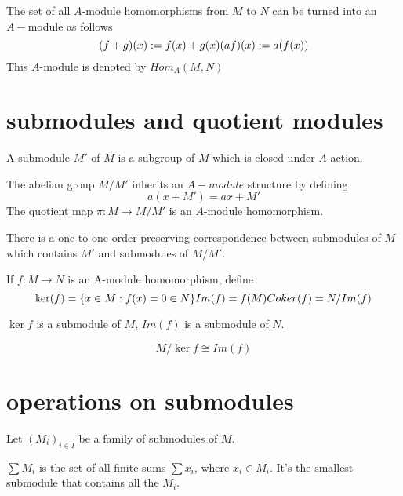 \documentclass[11pt,fleqn]{book} %
\begin{document}
\begin{CJK}{UTF8}{gkai}
\begin{definition}
	The set of all $A$-module homomorphisms from $M$ to $N$ can be turned into an $A-$module as follows \[
		(f+g)(x) := f(x) + g(x) \\
		(af)(x) := a(f(x))\]
	This $A$-module is denoted by $Hom_A(M, N)$
\end{definition}

\section{submodules and quotient modules}
\begin{definition}
	A submodule $M'$ of $M$ is a subgroup of $M$ which is closed under $A$-action.
\end{definition}

\begin{definition}
	[quotient] The abelian group $M/M'$ inherits an $A-module$ structure by defining 
	\[
		a(x + M') = ax + M'\]
	The quotient map $\pi: M \to M/M'$ is an $A$-module homomorphism.
\end{definition}

\begin{proposition}
	 There is a one-to-one order-preserving correspondence between submodules of $M$ which contains $M'$ and submodules of $M/M'$.
\end{proposition}

\begin{definition}
	 If $f:M\to N$ is an A-module homomorphism, define 
	\[
		\ker(f) = \{x\in M: f(x) = 0\in N\}\\
		Im(f) = f(M)\\
		Coker (f) = N/Im(f)\]
\end{definition}
\begin{proposition}
	$\ker f$ is a submodule of $M$, $Im(f)$ is a submodule of $N$.
\end{proposition}
\begin{proposition}
	\[
		M/\ker f \cong Im(f)\]
\end{proposition}

\section{operations on submodules}
Let $(M_i)_{i\in I}$ be a family of submodules of $M$.
\begin{definition}
	[sum] $\sum M_i$ is the set of all finite sums $\sum x_i$, where $x_i \in M_i$. It's the smallest submodule that contains all the $M_i$.
\end{definition}


\end{CJK}
\end{document}

